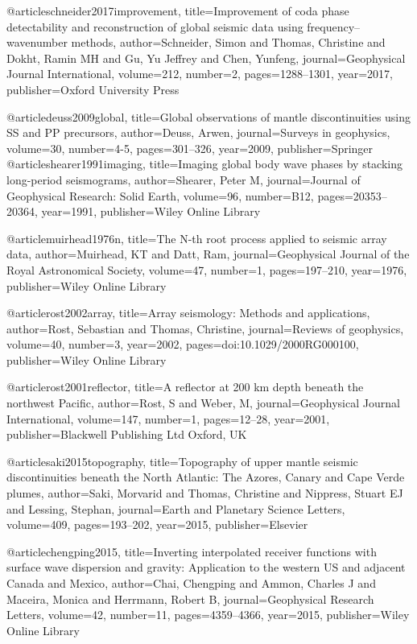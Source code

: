 @article{schneider2017improvement,
  title={Improvement of coda phase detectability and reconstruction of global seismic data using frequency--wavenumber methods},
  author={Schneider, Simon and Thomas, Christine and Dokht, Ramin MH and Gu, Yu Jeffrey and Chen, Yunfeng},
  journal={Geophysical Journal International},
  volume={212},
  number={2},
  pages={1288--1301},
  year={2017},
  publisher={Oxford University Press}
}


@article{deuss2009global,
  title={Global observations of mantle discontinuities using SS and PP precursors},
  author={Deuss, Arwen},
  journal={Surveys in geophysics},
  volume={30},
  number={4-5},
  pages={301--326},
  year={2009},
  publisher={Springer}
}
@article{shearer1991imaging,
  title={Imaging global body wave phases by stacking long-period seismograms},
  author={Shearer, Peter M},
  journal={Journal of Geophysical Research: Solid Earth},
  volume={96},
  number={B12},
  pages={20353--20364},
  year={1991},
  publisher={Wiley Online Library}
}

@article{muirhead1976n,
  title={The N-th root process applied to seismic array data},
  author={Muirhead, KT and Datt, Ram},
  journal={Geophysical Journal of the Royal Astronomical Society},
  volume={47},
  number={1},
  pages={197--210},
  year={1976},
  publisher={Wiley Online Library}
}

@article{rost2002array,
  title={Array seismology: Methods and applications},
  author={Rost, Sebastian and Thomas, Christine},
  journal={Reviews of geophysics},
  volume={40},
  number={3},
  year={2002},
  pages={doi:10.1029/2000RG000100},
  publisher={Wiley Online Library}
}

@article{rost2001reflector,
  title={A reflector at 200 km depth beneath the northwest Pacific},
  author={Rost, S and Weber, M},
  journal={Geophysical Journal International},
  volume={147},
  number={1},
  pages={12--28},
  year={2001},
  publisher={Blackwell Publishing Ltd Oxford, UK}
}

@article{saki2015topography,
  title={Topography of upper mantle seismic discontinuities beneath the North Atlantic: The Azores, Canary and Cape Verde plumes},
  author={Saki, Morvarid and Thomas, Christine and Nippress, Stuart EJ and Lessing, Stephan},
  journal={Earth and Planetary Science Letters},
  volume={409},
  pages={193--202},
  year={2015},
  publisher={Elsevier}
}

@article{chengping2015,
  title={Inverting interpolated receiver functions with surface wave dispersion and gravity: Application to the western US and adjacent Canada and Mexico},
  author={Chai, Chengping and Ammon, Charles J and Maceira, Monica and Herrmann, Robert B},
  journal={Geophysical Research Letters},
  volume={42},
  number={11},
  pages={4359--4366},
  year={2015},
  publisher={Wiley Online Library}
}

